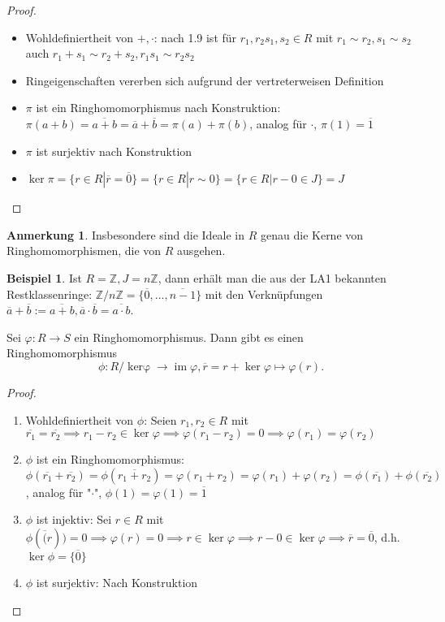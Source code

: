\documentclass[a4paper, titlepage]{article}
\theoremstyle{definition}
\newtheorem{bsp}[satz]{Beispiel}
\newtheorem*{anm}{Anmerkung}
\newcommand{\Z}{\mathbb{Z}}
\begin{document}
\begin{proof}
	\begin{itemize}
		\item Wohldefiniertheit von $+,\cdot$: nach 1.9 ist für $r_1,r_2s_1,s_2\in R$ mit $r_1 \sim r_2, s_1\sim s_2$ auch $r_1+s_1 \sim r_2+s_2, r_1s_1\sim r_2s_2$
		\item Ringeigenschaften vererben sich aufgrund der vertreterweisen Definition
		\item $\pi$ ist ein Ringhomomorphismus nach Konstruktion: $\pi(a+b)=\overline{a+b}=\overline{a}+\overline{b}=\pi(a)+\pi(b)$, analog für $\cdot$, $\pi(1)=\overline{1}$
		\item $\pi$ ist surjektiv nach Konstruktion 
		\item $\operatorname{ker}\pi=\{r\in R|\overline{r}=\overline{0}\}=\{r\in R|r\sim 0\}=\{r \in R|r-0\in J\}=J$
	\end{itemize}
\end{proof}
\begin{anm}
 Insbesondere sind die Ideale in $R$ genau die Kerne von Ringhomomorphismen, die von $R$ ausgehen.
\end{anm}
 \begin{bsp}
	Ist $R=\Z,J=n\Z$, dann erhält man die aus der LA1 bekannten Restklassenringe:
	$\Z/n\Z=\{\overline{0},...,\overline{n-1}\}$ mit den Verknüpfungen $\overline{a}+\overline{b}:=\overline{a+b},\overline{a}\cdot\overline{b}=\overline{a\cdot b}$.
\end{bsp}
\begin{satz}
	Sei $\varphi:R \longrightarrow S$ ein Ringhomomorphismus. Dann gibt es einen Ringhomomorphismus 
	$$\phi: R/\operatorname{ker \varphi} \longrightarrow \operatorname{im}\varphi, \overline{r}=r+\operatorname{ker}\varphi\mapsto \varphi(r).$$
\end{satz}
\begin{proof}
	\begin{enumerate}
		\item Wohldefiniertheit von $\phi$: Seien $r_1,r_2\in R$ mit $\overline{r_1}=\overline{r_2}\implies r_1-r_2\in \operatorname{ker}\varphi\implies \varphi(r_1-r_2)=0\implies \varphi(r_1)=\varphi(r_2)$
		\item $\phi$ ist ein Ringhomomorphismus: $\phi(\overline{r_1}+\overline{r_2})=\phi(\overline{r_1+r_2})=\varphi(r_1+r_2)=\varphi(r_1)+\varphi(r_2)=\phi(\overline{r_1})+\phi(\overline{r_2})$, analog für "$\cdot$", $\phi(1)=\varphi(1)=\overline{1}$
		\item $\phi $ ist injektiv: Sei  $r\in R$ mit $\phi(\overline(r))=0\implies\varphi(r)=0\implies r\in \operatorname{ker}\varphi\implies r-0\in \operatorname{ker}\varphi\implies \overline{r}=\overline{0}$, d.h. $\operatorname{ker}\phi=\{\overline{0}\}$
		\item $\phi$ ist surjektiv: Nach Konstruktion
	\end{enumerate}
\end{proof}
\end{document}
